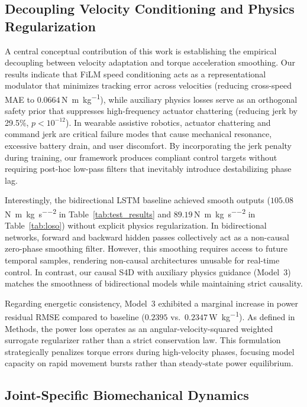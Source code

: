 \documentclass[fleqn,10pt]{wlscirep}
\newcommand{\Nmskg}{\si{\newton\metre\per\kilogram}}
\newcommand{\Nmskgsq}{\si{\newton\metre\per\kilogram\per\second\squared}}
\newcommand{\Wkg}{\si{\watt\per\kilogram}}
\begin{document}
\subsection{Decoupling Velocity Conditioning and Physics Regularization}

A central conceptual contribution of this work is establishing the empirical decoupling between velocity adaptation and torque acceleration smoothing. Our results indicate that FiLM speed conditioning acts as a representational modulator that minimizes tracking error across velocities (reducing cross-speed MAE to $0.0664$\,\Nmskg{}), while auxiliary physics losses serve as an orthogonal safety prior that suppresses high-frequency actuator chattering (reducing jerk by 29.5\%, $p < 10^{-12}$). In wearable assistive robotics, actuator chattering and command jerk are critical failure modes that cause mechanical resonance, excessive battery drain, and user discomfort\cite{tucker2015control, baud2021review}. By incorporating the jerk penalty during training, our framework produces compliant control targets without requiring post-hoc low-pass filters that inevitably introduce destabilizing phase lag.

Interestingly, the bidirectional LSTM baseline achieved smooth outputs ($105.08$\,\Nmskgsq{} in Table~\ref{tab:test_results} and $89.19$\,\Nmskgsq{} in Table~\ref{tab:loso}) without explicit physics regularization. In bidirectional networks, forward and backward hidden passes collectively act as a non-causal zero-phase smoothing filter. However, this smoothing requires access to future temporal samples, rendering non-causal architectures unusable for real-time control. In contrast, our causal S4D with auxiliary physics guidance (Model~3) matches the smoothness of bidirectional models while maintaining strict causality.

Regarding energetic consistency, Model~3 exhibited a marginal increase in power residual RMSE compared to baseline ($0.2395$ vs.\ $0.2347$\,\Wkg{}). As defined in Methods, the power loss operates as an angular-velocity-squared weighted surrogate regularizer rather than a strict conservation law. This formulation strategically penalizes torque errors during high-velocity phases, focusing model capacity on rapid movement bursts rather than steady-state power equilibrium.

\subsection{Joint-Specific Biomechanical Dynamics}
\end{document}
